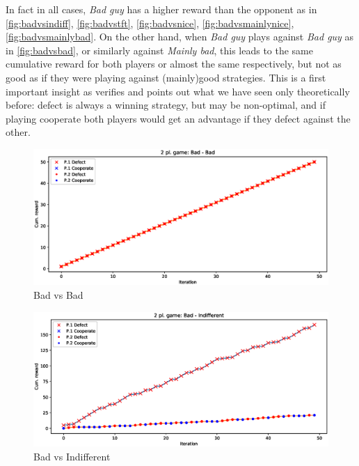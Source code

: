 \documentclass[journal,a4paper,10pt,twoside,draft=false]{IEEEtran}
\begin{document}
In fact in all cases, \textit{Bad guy} has a higher reward than the opponent as in \autoref{fig:badvsindiff}, \autoref{fig:badvstft}, \autoref{fig:badvsnice}, \autoref{fig:badvsmainlynice}, \autoref{fig:badvsmainlybad}. 
On the other hand, when \textit{Bad guy} plays against \textit{Bad guy} as in \autoref{fig:badvsbad}, or similarly against \textit{Mainly bad}, this leads to the same cumulative reward for both players or almost the same respectively, but not as good as if they were playing against (mainly)good strategies. This is a first important insight as verifies and points out what we have seen only theoretically before: defect is always a winning strategy, but may be non-optimal, and if playing cooperate both players would get an advantage if they defect against the other.


\begin{figure}[ht]
    \centering
    \includegraphics[width=1\columnwidth]{../img/ipd2p/ipd2p-rewards-Bad-Bad}
    \caption{Bad vs Bad}
    \label{fig:badvsbad}
\end{figure}

\begin{figure}[ht]
    \centering
    \includegraphics[width=1\columnwidth]{../img/ipd2p/ipd2p-rewards-Bad-Indifferent.eps}
    \caption{Bad vs Indifferent}
    \label{fig:badvsindiff}
\end{figure}
\end{document}

